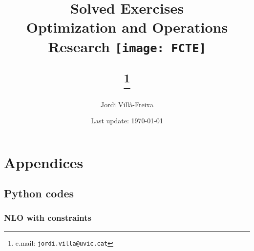\documentclass[12pt]{article}
\begin{document}
\title{Solved Exercises \\ \large Optimization and Operations Research \newline \newline \texttt{[image: FCTE]}
\author{Jordi Villà-Freixa}
\thanks{e.mail: \texttt{jordi.villa@uvic.cat}}}

\date{Last update: \today}
\maketitle
\tableofcontents
\listofexercises
\newpage

\begin{ExerciseList}

\end{ExerciseList}

\section{Appendices}

\subsection{Python codes}

\lstlistoflistings

\subsubsection{NLO with constraints}



\end{document}
